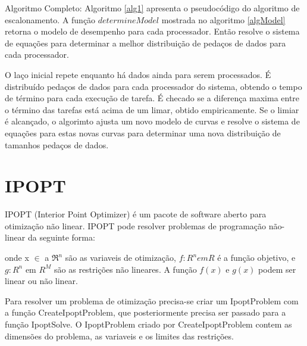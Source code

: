 Algoritmo Completo: Algoritmo \ref{alg1} apresenta o pseudocódigo do algoritmo de escalonamento. A função $determineModel$ mostrada no algoritmo \ref{algModel} retorna o modelo de desempenho para cada processador. Então resolve o sistema de equações para determinar a melhor distribuição de pedaços de dados para cada processador.

O laço inicial repete enquanto há dados ainda para serem processados. É distribuído pedaços de dados para cada processador do sistema, obtendo o tempo de término para cada execução de tarefa. É checado se a diferença maxima entre o término das tarefas está acima de um limar, obtido empiricamente. Se o limiar é alcançado, o algorimto ajusta um novo modelo de curvas e resolve o sistema de equações para estas novas curvas para determinar uma nova distribuição de tamanhos pedaços de dados.

 


\section{IPOPT}\label{cap4:ipopt}

IPOPT (Interior Point Optimizer) é um pacote de software aberto para otimização não linear. IPOPT pode resolver problemas de programação não-linear da seguinte forma:
	


onde x $\in$ a $\Re ^ n$ são as variaveis de otimização, $f : R^n em R$ é a função objetivo, e $g: R^n$ em $R^M$ são as restrições não lineares. A função $f(x)$ e $g(x)$ podem ser linear ou não linear.  

Para resolver um problema de otimização precisa-se criar um IpoptProblem com a função CreateIpoptProblem, que posteriormente precisa ser passado para a função IpoptSolve. O IpoptProblem criado por CreateIpoptProblem contem as dimensões do problema, as variaveis e os limites das restrições.








